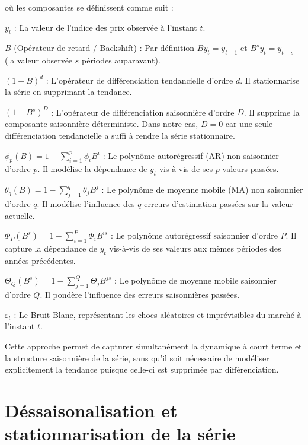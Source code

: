 \documentclass[
12pt,          %
a4paper,       %
oneside,       %
openright      %
]{report}
\begin{document}
 où les composantes se définissent comme suit :
 
 $y_t$ : La valeur de l'indice des prix observée à l'instant $t$.
 
 $B$ (Opérateur de retard / Backshift) : Par définition $By_t = y_{t-1}$ et 
 $B^s y_t = y_{t-s}$ (la valeur observée $s$ périodes auparavant).
 
 $(1 - B)^d$ : L'opérateur de différenciation tendancielle d'ordre $d$. Il 
 stationnarise la série en supprimant la tendance.
 
 $(1 - B^s)^D$ : L'opérateur de différenciation saisonnière d'ordre $D$. Il 
 supprime la composante saisonnière déterministe. Dans notre cas, $D = 0$ 
 car une seule différenciation tendancielle a suffi à rendre la série stationnaire.
 
 $\phi_p(B) = 1 - \displaystyle\sum_{i=1}^{p} \phi_i B^i$ : Le polynôme 
 autorégressif (AR) non saisonnier d'ordre $p$. Il modélise la dépendance de 
 $y_t$ vis-à-vis de ses $p$ valeurs passées.
 
 $\theta_q(B) = 1 - \displaystyle\sum_{j=1}^{q} \theta_j B^j$ : Le polynôme 
 de moyenne mobile (MA) non saisonnier d'ordre $q$. Il modélise l'influence 
 des $q$ erreurs d'estimation passées sur la valeur actuelle.
 
 $\Phi_P(B^s) = 1 - \displaystyle\sum_{i=1}^{P} \Phi_i B^{is}$ : Le polynôme 
 autorégressif saisonnier d'ordre $P$. Il capture la dépendance de $y_t$ 
 vis-à-vis de ses valeurs aux mêmes périodes des années précédentes.
 
 $\Theta_Q(B^s) = 1 - \displaystyle\sum_{j=1}^{Q} \Theta_j B^{js}$ : Le polynôme 
 de moyenne mobile saisonnier d'ordre $Q$. Il pondère l'influence des erreurs 
 saisonnières passées.
 
 $\varepsilon_t$ : Le Bruit Blanc, représentant les chocs aléatoires et 
 imprévisibles du marché à l'instant $t$.
 
 Cette approche permet de capturer simultanément la dynamique 
 à court terme et la structure saisonnière de la série, sans qu'il soit 
 nécessaire de modéliser explicitement la tendance puisque celle-ci est 
 supprimée par différenciation.
 
 
 
 
 
 
 
 
  \section{ Déssaisonalisation et stationnarisation de la série }
  
\end{document}
